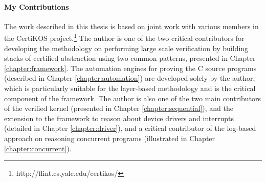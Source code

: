 \paragraph{My Contributions}
The work described in this thesis is based on joint work with various members
in the CertiKOS project.\footnote{http://flint.cs.yale.edu/certikos/}
The author is one of the two critical contributors for developing the methodology
on performing large scale verification by building stacks of certified abstraction
using two common patterns, presented in Chapter \ref{chapter:framework}. The automation
engines for proving the C source programs (described in Chapter \ref{chapter:automation})
are developed solely by the author, which is particularly suitable for the
layer-based methodology and is the critical component of the framework. 
The author is also one of the two main contributors of the verified kernel (presented
in Chapter \ref{chapter:sequential}), and the
extension to the framework to reason about device drivers and interrupts
(detailed in Chapter \ref{chapter:driver}), and a critical contributor
of the log-based approach on reasoning
concurrent programs (illustrated in Chapter \ref{chapter:concurrent}). 

